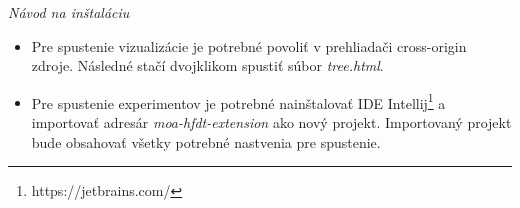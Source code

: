 \textit{Návod na inštaláciu}
\begin{itemize}
	\item Pre spustenie vizualizácie je potrebné povoliť v prehliadači cross-origin zdroje. Následné stačí dvojklikom spustiť súbor \textit{tree.html}.
	\item Pre spustenie experimentov je potrebné nainštalovať IDE Intellij\footnote{https://jetbrains.com/} a importovať adresár \textit{moa-hfdt-extension} ako nový projekt. Importovaný projekt bude obsahovať všetky potrebné nastvenia pre spustenie.
\end{itemize}




